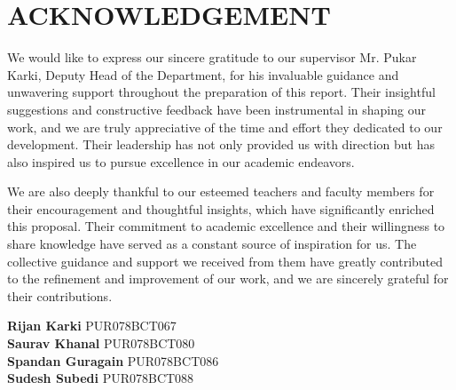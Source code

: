 \chapter*{ACKNOWLEDGEMENT}

We would like to express our sincere gratitude to our supervisor Mr. Pukar Karki, Deputy Head of the Department, for his invaluable guidance and unwavering support throughout the preparation of this report. Their insightful suggestions and constructive feedback have been instrumental in shaping our work, and we are truly appreciative of the time and effort they dedicated to our development. Their leadership has not only provided us with direction but has also inspired us to pursue excellence in our academic endeavors.

We are also deeply thankful to our esteemed teachers and faculty members for their encouragement and thoughtful insights, which have significantly enriched this proposal. Their commitment to academic excellence and their willingness to share knowledge have served as a constant source of inspiration for us. The collective guidance and support we received from them have greatly contributed to the refinement and improvement of our work, and we are sincerely grateful for their contributions.

\vspace{1cm}
\textbf{Rijan Karki} 
PUR078BCT067\\
\textbf{Saurav Khanal} 
PUR078BCT080\\
\textbf{Spandan Guragain} 
PUR078BCT086\\
\textbf{Sudesh Subedi} 
PUR078BCT088\\
